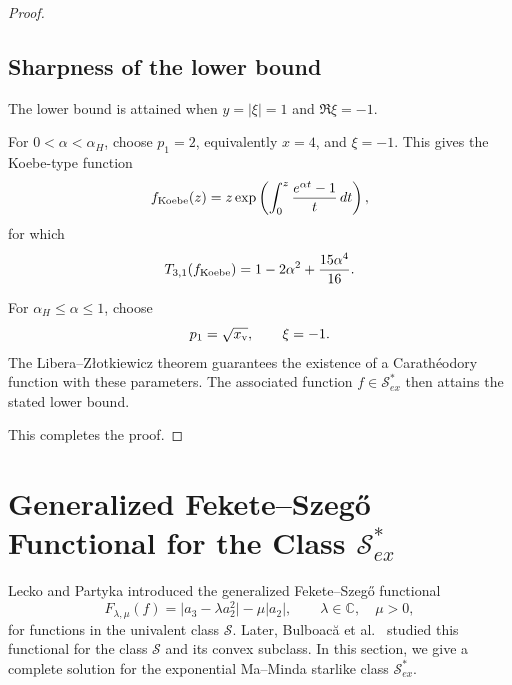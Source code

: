 \documentclass[11pt,reqno]{amsart}
\numberwithin{equation}{section}
\begin{document}
\begin{proof}
\subsection*{Sharpness of the lower bound}
The lower bound is attained when $y=|\xi|=1$ and $\Re\xi=-1$.

For $0<\alpha<\alpha_H$, choose $p_1=2$, equivalently $x=4$, and $\xi=-1$. This gives the Koebe-type function
\[
f_{\rm Koebe}(z)
=
z\exp\left(\int_0^z\frac{e^{\alpha t}-1}{t}\,dt\right),
\]
for which
\[
T_{3,1}(f_{\rm Koebe})
=
1-2\alpha^2+\frac{15\alpha^4}{16}.
\]

For $\alpha_H\le\alpha\le1$, choose
\[
p_1=\sqrt{x_{\rm v}},
\qquad
\xi=-1.
\]
The Libera--Z{\l}otkiewicz theorem guarantees the existence of a Carath\'eodory function with these parameters. The associated function $f\in\mathcal{S}_{ex}^{\ast}$ then attains the stated lower bound.

This completes the proof.
\end{proof}

\section{Generalized Fekete--Szeg\H{o} Functional for the Class $\mathcal{S}_{ex}^{\ast}$}

Lecko and Partyka \cite{Lecko2024} introduced the generalized Fekete--Szeg\H{o} functional
\begin{equation}\label{FG}
F_{\lambda,\mu}(f)
=
\bigl|a_3-\lambda a_2^2\bigr|
-
\mu |a_2|,
\qquad
\lambda\in\mathbb{C},\quad \mu>0,
\end{equation}
for functions in the univalent class $\mathcal{S}$. Later, Bulboac\u{a} et al.\ \cite{Bulboaca2025} studied this functional for the class $\mathcal{S}$ and its convex subclass. In this section, we give a complete solution for the exponential Ma--Minda starlike class $\mathcal{S}_{ex}^{\ast}$.
\end{document}
